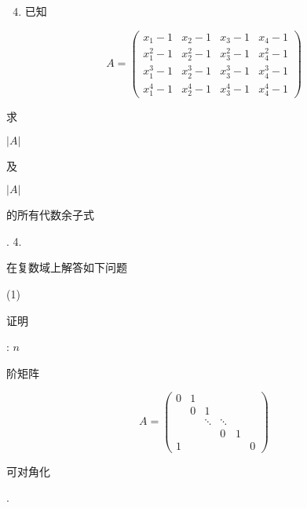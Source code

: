 \documentclass[10pt]{article}
\begin{document}
\begin{enumerate}
  \setcounter{enumi}{3}
  \item \begin{CJK}{UTF8}{mj}已知\end{CJK}
\end{enumerate}
$$
A=\left(\begin{array}{llll}
x_{1}-1 & x_{2}-1 & x_{3}-1 & x_{4}-1 \\
x_{1}^{2}-1 & x_{2}^{2}-1 & x_{3}^{2}-1 & x_{4}^{2}-1 \\
x_{1}^{3}-1 & x_{2}^{3}-1 & x_{3}^{3}-1 & x_{4}^{3}-1 \\
x_{1}^{4}-1 & x_{2}^{4}-1 & x_{3}^{4}-1 & x_{4}^{4}-1
\end{array}\right)
$$
\begin{CJK}{UTF8}{mj}求\end{CJK} $|A|$ \begin{CJK}{UTF8}{mj}及\end{CJK} $|A|$ \begin{CJK}{UTF8}{mj}的所有代数余子式\end{CJK}. 4. \begin{CJK}{UTF8}{mj}在复数域上解答如下问题\end{CJK}

(1) \begin{CJK}{UTF8}{mj}证明\end{CJK}: $n$ \begin{CJK}{UTF8}{mj}阶矩阵\end{CJK}
$$
A=\left(\begin{array}{llllll}
0 & 1 & & & \\
& 0 & 1 & & \\
& & \ddots & \ddots & \\
& & & 0 & 1 & \\
1 & & & & & 0
\end{array}\right)
$$
\begin{CJK}{UTF8}{mj}可对角化\end{CJK}.
\end{document}
